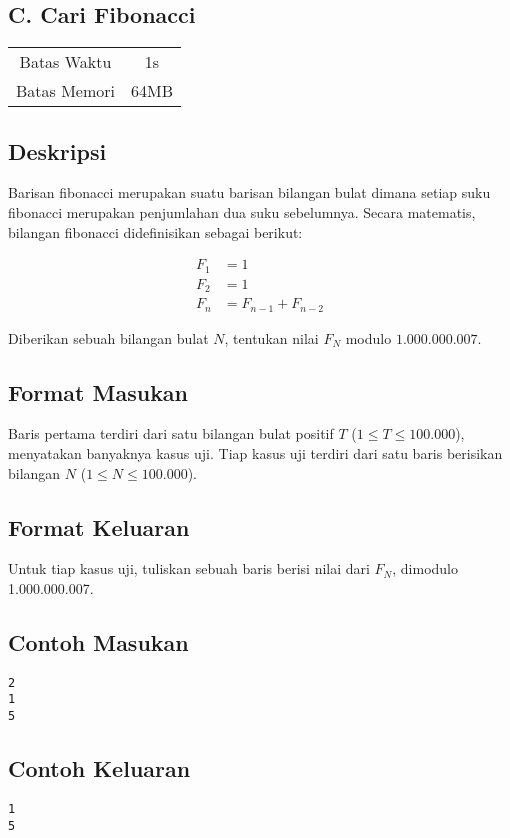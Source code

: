 \documentclass{article}
\begin{document}
\begin{center}
    \section*{C. Cari Fibonacci}

    \begin{tabular}{ | c c | }
        \hline
        Batas Waktu  & 1s \\
        Batas Memori & 64MB \\
        \hline
    \end{tabular}
\end{center}

\subsection*{Deskripsi}

Barisan fibonacci merupakan suatu barisan bilangan bulat dimana setiap suku fibonacci merupakan penjumlahan dua suku sebelumnya. Secara matematis, bilangan fibonacci didefinisikan sebagai berikut:

\begin{align*}
F_1 & = 1 \\
F_2 & = 1 \\
F_n & = F_{n-1} + F_{n-2}
\end{align*}

Diberikan sebuah bilangan bulat $N$, tentukan nilai $F_N$ modulo $1.000.000.007$.

\subsection*{Format Masukan}

Baris pertama terdiri dari satu bilangan bulat positif $T$ ($1 \leq T \leq 100.000$), menyatakan banyaknya kasus uji.
Tiap kasus uji terdiri dari satu baris berisikan bilangan $N$ ($1 \leq N \leq 100.000$).

\subsection*{Format Keluaran}

Untuk tiap kasus uji, tuliskan sebuah baris berisi nilai dari $F_N$, dimodulo 1.000.000.007.
\\

\begin{multicols}{2}
\subsection*{Contoh Masukan}
\begin{lstlisting}
2
1
5
\end{lstlisting}
\columnbreak
\subsection*{Contoh Keluaran}
\begin{lstlisting}
1
5
\end{lstlisting}
\vfill
\null
\end{multicols}

\pagebreak
\end{document}
